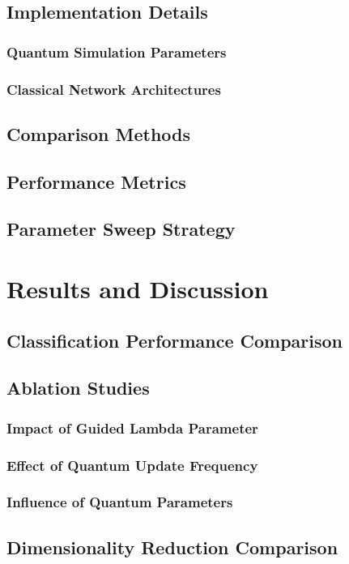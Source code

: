 \documentclass[conference]{IEEEtran}
\begin{document}
\subsection{Implementation Details}
\subsubsection{Quantum Simulation Parameters}
\subsubsection{Classical Network Architectures}
\subsection{Comparison Methods}
\subsection{Performance Metrics}
\subsection{Parameter Sweep Strategy}

\section{Results and Discussion}
\subsection{Classification Performance Comparison}
\subsection{Ablation Studies}
\subsubsection{Impact of Guided Lambda Parameter}
\subsubsection{Effect of Quantum Update Frequency}
\subsubsection{Influence of Quantum Parameters}
\subsection{Dimensionality Reduction Comparison}
\end{document}
